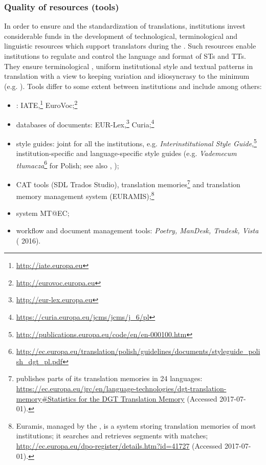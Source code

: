 \documentclass[output=paper]{langsci/langscibook}
\begin{document}
\subsubsection{Quality of resources (tools)}\label{sec:biel:3.2.4}

In order to ensure  and the standardization of translations,  institutions invest considerable funds in the development of technological, terminological and linguistic resources which support translators during the . Such resources enable  institutions to regulate and control the language and format of STs and TTs. They ensure terminological , uniform institutional style and textual patterns in translation with a view to keeping variation and idiosyncrasy to the minimum (e.g. \citealt[70]{Biel2014}). Tools differ to some extent between institutions and include among others:

\begin{itemize}
\item 
{}: IATE,\footnote{\url{http://iate.europa.eu}} EuroVoc;\footnote{\url{http://eurovoc.europa.eu}}
\item 
databases of documents: EUR-Lex,\footnote{\url{http://eur-lex.europa.eu}} Curia;\footnote{\url{https://curia.europa.eu/jcms/jcms/j\_6/pl}}
\item 
style guides: joint for all the institutions, e.g. \textit{Interinstitutional Style Guide},\footnote{\url{http://publications.europa.eu/code/en/en-000100.htm}} institution-specific and language-specific style guides (e.g. \textit{Vademecum tłumacza}\footnote{\url{http://ec.europa.eu/translation/polish/guidelines/documents/styleguide_polish_dgt_pl.pdf}} for Polish; see also \citealt{Svoboda2017}, );
\item  CAT tools (SDL Trados Studio),
translation memories\footnote{ publishes parts of its translation memories in 24 languages: \url{https://ec.europa.eu/jrc/en/language-technologies/dgt-translation-memory\#Statistics for the DGT Translation Memory} (Accessed 2017-07-01).} 
and translation memory management system (EURAMIS);\footnote{Euramis, managed by the , is a system storing translation memories of most  institutions; it searches and retrieves segments with matches; \url{http://ec.europa.eu/dpo-register/details.htm?id=41727} (Accessed 2017-07-01).}
\item 
{} system MT@EC;
\item 
workflow and document management tools: \textit{Poetry, ManDesk, Trad}\textit{esk,  Vista} ( 2016).
\end{itemize}
\end{document}

